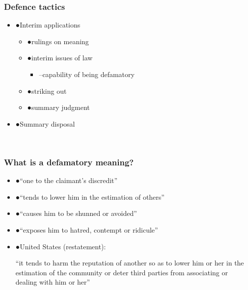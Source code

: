 \documentclass[ignorenonframetext,]{beamer}
\begin{document}
\begin{frame}
\frametitle{Defence tactics}

\begin{itemize}
\item  {●}Interim applications

  \begin{itemize}
  \item    {●}rulings on meaning
  \item    {●}interim issues of law

    \begin{itemize}
    \item      {--}capability of being defamatory
    \end{itemize}
  \item    {●}striking out
  \item    {●}summary judgment
  \end{itemize}
\item  {●}Summary disposal
\end{itemize}

~


\end{frame}

\begin{frame}
\frametitle{What is a defamatory meaning?}

\begin{itemize}
\item  {●}``one to the claimant's discredit''
\item  {●}``tends to lower him in the estimation of others''
\item  {●}``causes him to be shunned or avoided''
\item  {●}``exposes him to hatred, contempt or ridicule''
\item  {●}United States (restatement):

  {}``it tends to harm the reputation of another so as to lower him or
  her in the estimation of the community or deter third parties from
  associating or dealing with him or her''
\end{itemize}

~


\end{frame}
\end{document}
